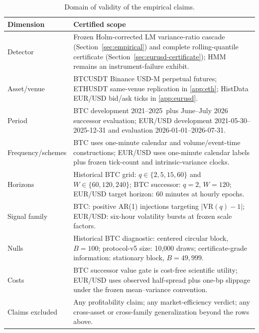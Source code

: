 \documentclass[3p]{elsarticle}
\newcommand{\VR}{\ensuremath{\mathrm{VR}}}
\newcommand{\dataspan}{2021--2025}
\begin{document}
\begin{table}[htbp]
\centering
\caption{Domain of validity of the empirical claims.}
\label{tab:validity}
\small
\begin{tabularx}{\textwidth}{@{}lX@{}}
\toprule
Dimension & Certified scope \\
\midrule
Detector & Frozen Holm-corrected LM variance-ratio cascade (Section~\ref{sec:empirical}) and complete rolling-quantile certificate (Section~\ref{sec:eurusd-certificate}); HMM remains an instrument-failure exhibit. \\
Asset/venue & BTCUSDT Binance USD-M perpetual futures; ETHUSDT same-venue replication in \ref{app:eth}; HistData EUR/USD bid/ask ticks in \ref{app:eurusd}. \\
Period & BTC development \dataspan\ plus June--July 2026 successor evaluation; EUR/USD development 2021-05-30--2025-12-31 and evaluation 2026-01-01--2026-07-31. \\
Frequency/schemes & BTC uses one-minute calendar and volume/event-time constructions; EUR/USD uses one-minute calendar labels plus frozen tick-count and intrinsic-variance clocks. \\
Horizons & Historical BTC grid: $q\in\{2,5,15,60\}$ and $W\in\{60,120,240\}$; BTC successor: $q=2$, $W=120$; EUR/USD target horizon: 60 minutes at hourly epochs. \\
Signal family & BTC: positive AR(1) injections targeting $|\VR(q)-1|$; EUR/USD: six-hour volatility bursts at frozen scale factors. \\
Nulls & Historical BTC diagnostic: centered circular block, $B=100$; protocol-v5 size: 10,000 draws; certificate-grade information: stationary block, $B=49{,}999$. \\
Costs & BTC successor value gate is cost-free scientific utility; EUR/USD uses observed half-spread plus one-bp slippage under the frozen mean--variance convention. \\
Claims excluded & Any profitability claim; any market-efficiency verdict; any cross-asset or cross-family generalization beyond the rows above. \\
\bottomrule
\end{tabularx}
\end{table}
\end{document}
